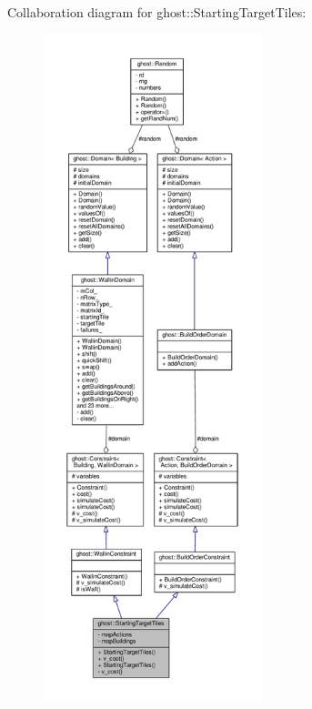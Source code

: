 Collaboration diagram for ghost\-:\-:Starting\-Target\-Tiles\-:
\nopagebreak
\begin{figure}[H]
\begin{center}
\leavevmode
\includegraphics[height=550pt]{classghost_1_1StartingTargetTiles__coll__graph}
\end{center}
\end{figure}
